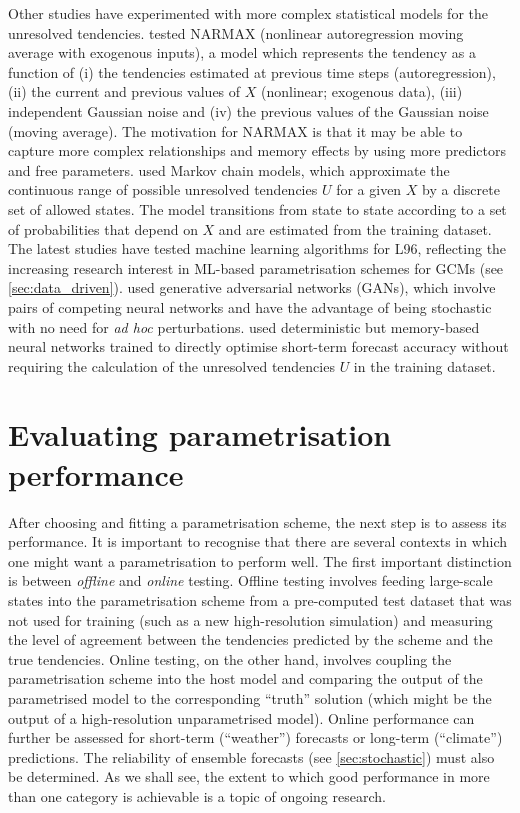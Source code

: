 \documentclass[../main.tex]{subfiles}
\begin{document}
Other studies have experimented with more complex statistical models for the
unresolved tendencies. \textcite{chorin2015} tested NARMAX (nonlinear
autoregression moving average with exogenous inputs), a model which represents
the tendency as a function of (i) the tendencies estimated at previous time
steps (autoregression), (ii) the current and previous values of $X$ (nonlinear;
exogenous data), (iii) independent Gaussian noise and (iv) the previous values
of the Gaussian noise (moving average). The motivation for NARMAX is that it
may be able to capture more complex relationships and memory effects by using
more predictors and free parameters. \textcite{crommelin2008,kwasniok2012} used
Markov chain models, which approximate the continuous range of possible
unresolved tendencies $U$ for a given $X$ by a discrete set of allowed states.
The model transitions from state to state according to a set of probabilities
that depend on $X$ and are estimated from the training dataset. The latest
studies have tested machine learning algorithms for L96, reflecting the
increasing research interest in ML-based parametrisation schemes for GCMs (see
\cref{sec:data_driven}). \textcite{gagne2020} used generative adversarial
networks (GANs), which involve pairs of competing neural networks and have the
advantage of being stochastic with no need for \emph{ad hoc} perturbations.
\textcite{bhouri2023} used deterministic but memory-based neural networks
trained to directly optimise short-term forecast accuracy without requiring the
calculation of the unresolved tendencies $U$ in the training dataset.


\section{Evaluating parametrisation performance}
After choosing and fitting a parametrisation scheme, the next step is to assess
its performance. It is important to recognise that there are several contexts
in which one might want a parametrisation to perform well. The first important
distinction is between \emph{offline} and \emph{online} testing. Offline
testing involves feeding large-scale states into the parametrisation scheme
from a pre-computed test dataset that was not used for training (such as a new
high-resolution simulation) and measuring the level of agreement between the
tendencies predicted by the scheme and the true tendencies. Online testing, on
the other hand, involves coupling the parametrisation scheme into the host
model and comparing the output of the parametrised model to the corresponding
``truth'' solution (which might be the output of a high-resolution
unparametrised model). Online performance can further be assessed for
short-term (``weather'') forecasts or long-term (``climate'') predictions. The
reliability of ensemble forecasts (see \cref{sec:stochastic}) must also
be determined. As we shall see, the extent to which good performance in more
than one category is achievable is a topic of ongoing research.
\end{document}

